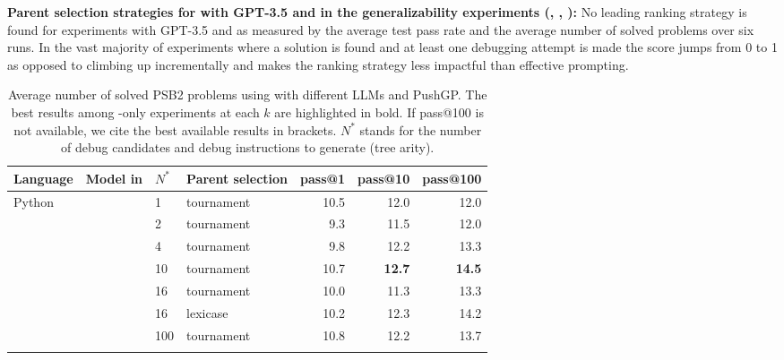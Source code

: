 \begin{framed}\noindent
\textbf{Parent selection strategies for \method{} with GPT-3.5 and \llama{} in the generalizability experiments (\rqllama{}, \rqmultirun{}, \rqlexicase{}):} 
No leading ranking strategy is found for \method{} experiments with GPT-3.5 and \llama{} as measured by the average test pass rate and the average number of solved problems over six runs. 
In the vast majority of experiments where a solution is found and at least one debugging attempt is made the score jumps from 0 to 1 as opposed to climbing up incrementally and makes the ranking strategy less impactful than effective prompting. 
\end{framed}


\begin{table}[t]
    \centering
    \caption{Average number of solved PSB2 problems using \method{} with different LLMs and PushGP. The best results among \method{}-only experiments at each $k$ are highlighted in bold. If pass@100 is not available, we cite the best available results in brackets. $N^*$ stands for the number of debug candidates and debug instructions to generate (tree arity).}\small
    \label{tab:generalizability-psb2}
\begin{adjustbox}{max width=.92\textwidth}
\begin{DIFnomarkup} %
\begin{tabular}{llllrrr}
\toprule
Language & Model in \method{} & $N^*$ & Parent selection &  pass@1 &  pass@10 &  pass@100 \\
\midrule
% 
Python & \gpt{} & 1   &         tournament &    10.5 &     12.0 &      12.0 \\
    &        & 2   &         tournament &     9.3 &     11.5 &      12.0 \\
    &        & 4   &         tournament &     9.8 &     12.2 &      13.3 \\
    &        & 10  &         tournament &    10.7 &     \textbf{12.7} &      \textbf{14.5} \\
    &        & 16  &         tournament &    10.0 &     11.3 &      13.3 \\
    &        & 16  &           lexicase &    10.2 &     12.3 &      14.2 \\
    &        & 100 &         tournament &    10.8 &     12.2 &      13.7 \\
\cline{3-7}\\[-8pt]

\end{tabular}
\end{DIFnomarkup}
\end{adjustbox}
\end{table}
